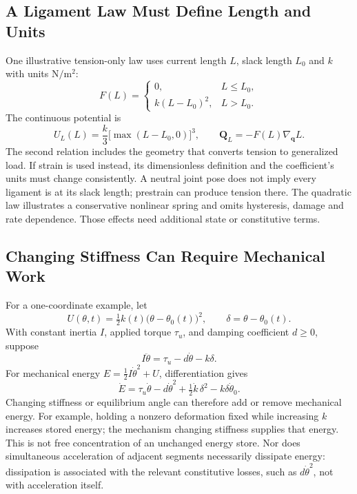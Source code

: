\subsection{A Ligament Law Must Define Length and Units}
One illustrative tension-only law uses current length $L$, slack length $L_0$ and $k$ with units $\mathrm{N/m^2}$:
\begin{equation}
F(L)=\begin{cases}
0,&L\le L_0,\\
k(L-L_0)^2,&L>L_0.
\end{cases}
\end{equation}
The continuous potential is
\begin{equation}
U_L(L)=\frac{k}{3}\bigl[\max(L-L_0,0)\bigr]^3,
\qquad \bm Q_L=-F(L)\nabla_{\bm q}L.
\end{equation}
The second relation includes the geometry that converts tension to generalized load. If strain is used instead, its dimensionless definition and the coefficient's units must change consistently. A neutral joint pose does not imply every ligament is at its slack length; prestrain can produce tension there. The quadratic law illustrates a conservative nonlinear spring and omits hysteresis, damage and rate dependence. Those effects need additional state or constitutive terms.

\subsection{Changing Stiffness Can Require Mechanical Work}
For a one-coordinate example, let
\begin{equation}
U(\theta,t)=\tfrac12 k(t)\bigl(\theta-\theta_0(t)\bigr)^2,
\qquad \delta=\theta-\theta_0(t).
\end{equation}
With constant inertia $I$, applied torque $\tau_u$, and damping coefficient $d\ge0$, suppose
\begin{equation}
I\ddot\theta=\tau_u-d\dot\theta-k\delta.
\end{equation}
For mechanical energy $E=\tfrac12I\dot\theta^2+U$, differentiation gives
\begin{equation}
\dot E=\tau_u\dot\theta-d\dot\theta^2
+\tfrac12\dot k\,\delta^2-k\delta\dot\theta_0.
\end{equation}
Changing stiffness or equilibrium angle can therefore add or remove mechanical energy. For example, holding a nonzero deformation fixed while increasing $k$ increases stored energy; the mechanism changing stiffness supplies that energy. This is not free concentration of an unchanged energy store. Nor does simultaneous acceleration of adjacent segments necessarily dissipate energy: dissipation is associated with the relevant constitutive losses, such as $d\dot\theta^2$, not with acceleration itself.

